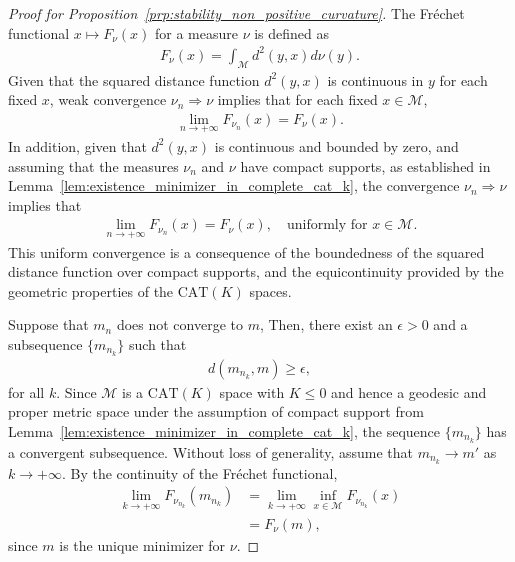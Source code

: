 \begin{proof}[Proof for Proposition~\ref{prp:stability_non_positive_curvature}]
    The Fréchet functional $x \mapsto F_\nu(x)$ for a measure $\nu$ is defined as
    \begin{align*}
        F_\nu(x) = \int_\mathcal{M} d^2(y, x) d\nu(y).
    \end{align*}
    Given that the squared distance function $d^2(y, x)$ is continuous in $y$ for each fixed $x$, weak convergence $\nu_n \Rightarrow \nu$ implies that for each fixed $x \in \mathcal{M}$,
    \begin{align*}
        \lim_{n \to +\infty} F_{\nu_n}(x) = F_\nu(x).
    \end{align*}
    In addition, given that $d^2(y, x)$ is continuous and bounded by zero, and assuming that the measures $\nu_n$ and $\nu$ have compact supports, as established in Lemma~\ref{lem:existence_minimizer_in_complete_cat_k}, the convergence $\nu_n \Rightarrow \nu$ implies that
    \begin{align*}
        \lim_{n \to +\infty} F_{\nu_n}(x) = F_\nu(x), \quad \text{uniformly for $x \in \mathcal{M}$}.
    \end{align*}
    This uniform convergence is a consequence of the boundedness of the squared distance function over compact supports, and the equicontinuity provided by the geometric properties of the $\mathrm{CAT}(K)$ spaces.

    Suppose that $m_n$ does not converge to $m$,
    Then, there exist an $\epsilon > 0$ and a subsequence $\{m_{n_k}\}$ such that
    \begin{align*}
        d(m_{n_k}, m) \geq \epsilon,
    \end{align*}
    for all $k$.
    Since $\mathcal{M}$ is a $\mathrm{CAT}(K)$ space with $K \leq 0$ and hence a geodesic and proper metric space under the assumption of compact support from Lemma~\ref{lem:existence_minimizer_in_complete_cat_k}, the sequence $\{m_{n_k}\}$ has a convergent subsequence.
    Without loss of generality, assume that $m_{n_k} \to m'$ as $k \to +\infty$.
    By the continuity of the Fréchet functional,
    \begin{align*}
        \lim_{k \to +\infty} F_{\nu_{n_k}}(m_{n_k}) &= \lim_{k \to +\infty}\inf_{x \in \mathcal{M}} F_{\nu_{n_k}}(x) \\
        &= F_\nu(m),
    \end{align*}
    since $m$ is the unique minimizer for $\nu$.


\end{proof}
